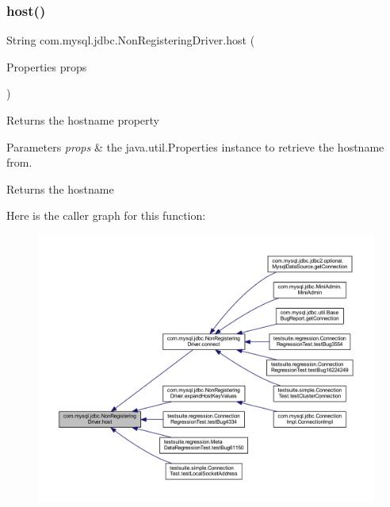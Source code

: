 \subsubsection{\texorpdfstring{host()}{host()}}
{\footnotesize\ttfamily String com.\+mysql.\+jdbc.\+Non\+Registering\+Driver.\+host (\begin{DoxyParamCaption}\item[{Properties}]{props }\end{DoxyParamCaption})}

Returns the hostname property


\begin{DoxyParams}{Parameters}
{\em props} & the java.\+util.\+Properties instance to retrieve the hostname from.\\
\hline
\end{DoxyParams}
\begin{DoxyReturn}{Returns}
the hostname 
\end{DoxyReturn}
Here is the caller graph for this function\+:
\nopagebreak
\begin{figure}[H]
\begin{center}
\leavevmode
\includegraphics[width=350pt]{classcom_1_1mysql_1_1jdbc_1_1_non_registering_driver_a3b94f70cb8b81fa3c6691fde8a63b776_icgraph}
\end{center}
\end{figure}
\mbox{\label{classcom_1_1mysql_1_1jdbc_1_1_non_registering_driver_ac4218acdf4a11d1fce9c18779564e2fb}} 
